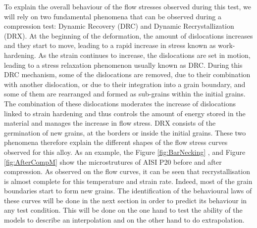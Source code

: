 \documentclass[twoside,english,1p,final,sort&compress]{elsarticle}
\theoremstyle{plain}
\begin{document}
To explain the overall behaviour of the flow stresses observed during this test, we will rely on two fundamental phenomena that can be observed during a compression test: Dynamic Recovery (DRC) and Dynamic Recrystallization (DRX). At the beginning of the deformation, the amount of dislocations increases and they start to move, leading to a rapid increase in stress known as work-hardening. As the strain continues to increase, the dislocations are set in motion, leading to a stress relaxation phenomenon usually known as DRC. During this DRC mechanism, some of the dislocations are removed, due to their combination with another dislocation, or due to their integration into a grain boundary, and some of them are rearranged and formed as sub-grains within the initial grains. The combination of these dislocations moderates the increase of dislocations linked to strain hardening and thus controls the amount of energy stored in the material and manages the increase in flow stress. DRX consists of the germination of new grains, at the borders or inside the initial grains. These two phenomena therefore explain the different shapes of the flow stress curves observed for this alloy. As an example, the Figure \ref{fig:BarNecking} , and Figure \ref{fig:AfterCompM} show the microstrutures of AISI P20 before and after compression. As observed on the flow curves, it can be seen that recrystallisation is almost complete for this temperature and strain rate. Indeed, most of the grain boundaries start to form new grains. The identification of the behavioural laws of these curves will be done in the next section in order to predict its behaviour in any test condition. This will be done on the one hand to test the ability of the models to describe an interpolation and on the other hand to do extrapolation.
\end{document}
